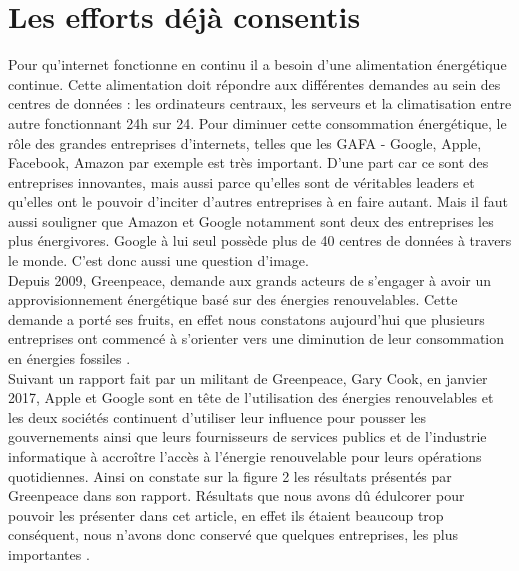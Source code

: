 \documentclass[a4paper,twocolumn,12pt]{article}
\begin{document}
\section{Les efforts déjà consentis}

	Pour qu’internet fonctionne en continu il a besoin d’une alimentation énergétique continue. Cette alimentation doit répondre aux différentes demandes au sein des centres de données : les ordinateurs centraux, les serveurs et la climatisation entre autre fonctionnant 24h sur 24. Pour diminuer cette consommation énergétique, le rôle des grandes entreprises d’internets, telles que les GAFA - Google, Apple, Facebook, Amazon par exemple est très important. D’une part car ce sont des entreprises innovantes, mais aussi parce qu’elles sont de véritables leaders et qu’elles ont le pouvoir d’inciter d’autres entreprises à en faire autant. Mais il faut aussi souligner que Amazon et Google notamment sont deux des entreprises les plus énergivores. Google à lui seul possède plus de 40 centres de données à travers le monde. C’est donc aussi une question d’image. \\ 

	Depuis 2009, Greenpeace, demande aux grands acteurs de s’engager à avoir un approvisionnement énergétique basé sur des énergies renouvelables. Cette demande a porté ses fruits, en effet nous constatons aujourd’hui que plusieurs entreprises ont commencé à s’orienter vers une diminution de leur consommation en énergies fossiles \cite{3}. \\

	Suivant un rapport fait par un militant de Greenpeace, Gary Cook, en janvier 2017, Apple et Google sont en tête de l'utilisation des énergies renouvelables et les deux sociétés continuent d’utiliser leur influence pour pousser les gouvernements ainsi que leurs fournisseurs de services publics et de l’industrie informatique à accroître l'accès à l'énergie renouvelable pour leurs opérations quotidiennes. Ainsi on constate sur la figure 2 les résultats présentés par Greenpeace dans son rapport. Résultats que nous avons dû édulcorer pour pouvoir les présenter dans cet article, en effet ils étaient beaucoup trop conséquent, nous n’avons donc conservé que quelques entreprises, les plus importantes \cite{12}.
\end{document}

